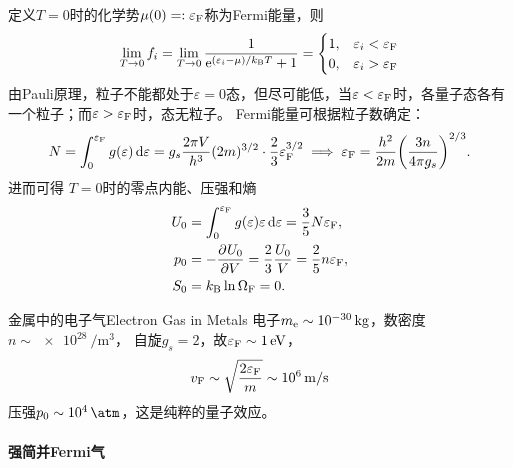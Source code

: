 定义$T=0$时的化学势$\mu(0)=:\varepsilon_\Fm$称为Fermi能量，则
\[
	\lim_{T\to0}f_i=\lim_{T\to0}\frac1{\e{(\varepsilon_i-\mu)/\kB T}+1}=
	\begin{cases}
		1,&\varepsilon_i<\varepsilon_\Fm\\
		0,&\varepsilon_i>\varepsilon_\Fm
	\end{cases}
\]
由Pauli原理，粒子不能都处于$\varepsilon=0$态，但尽可能低，当$\varepsilon<\varepsilon_\Fm$时，各量子态各有一个粒子；而$\varepsilon>\varepsilon_\Fm$时，态无粒子。
Fermi能量可根据粒子数确定：
\begin{equation}
	N=\int_0^{\varepsilon_\Fm}g(\varepsilon)\d\varepsilon=g_s\frac{2\pi V}{h^3}(2m)^{3/2}\cdot\frac23\varepsilon_\Fm^{3/2}
	\implies
	\varepsilon_\Fm=\frac{h^2}{2m}\biggkh{\frac{3n}{4\pi g_s}}^{2/3}.
\end{equation}
进而可得
$T=0$时的零点内能、压强和熵
\begin{subequations}
	\begin{align}
		U_0&=\int_0^{\varepsilon_\Fm}g(\varepsilon)\varepsilon\d\varepsilon=\frac35N\varepsilon_\Fm,\\
		p_0&=-\pv{U_0}V=\frac23\frac{U_0}V=\frac25n\varepsilon_\Fm,\\
		S_0&=\kB\ln\Om[F]=0.
	\end{align}
\end{subequations}

\begin{example}{金属中的电子气}{Electron Gas in Metals}
	电子$m_\elc\sim\SI{e-30}\kg$，数密度$n\sim\SI{e28}{\per\m\cubed}$， %
	自旋$g_s=2$，故$\varepsilon_\Fm\sim\SI1\eV$，
	\[
		v_\Fm\sim\sqrt{\frac{2\varepsilon_\Fm}m}\sim\SI[per-mode=symbol]{e6}{\m\per\s}
	\]
	压强$p_0\sim\SI{e4}\atm$，这是纯粹的量子效应。
\end{example}

\paragraph{强简并Fermi气}

